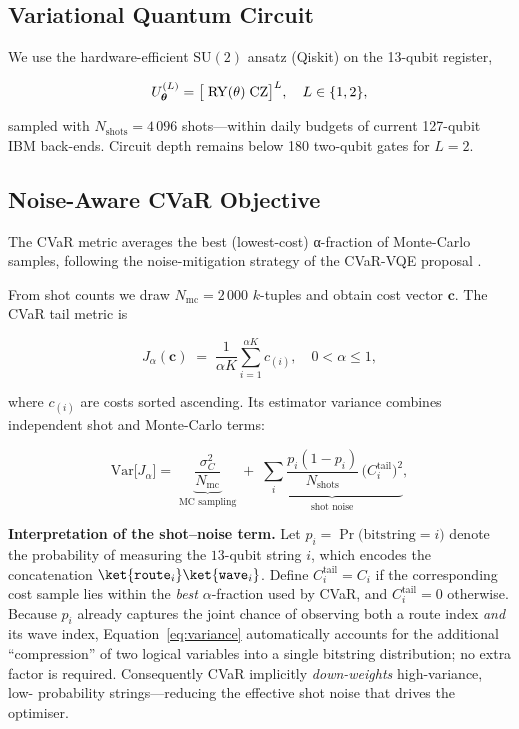 \subsection{Variational Quantum Circuit}

We use the hardware-efficient
\(\mathrm{SU}(2)\) ansatz (Qiskit) on the 13-qubit register,

\[
U^{(L)}_{\boldsymbol{\theta}}
=\bigl[\;{\rm RY}(\theta)\;{\rm CZ}\bigr]^{L},
\quad L\in\{1,2\},
\]

\noindent sampled with \(N_{\text{shots}}=4\,096\) shots—within daily
budgets of current 127-qubit IBM back-ends.  Circuit depth remains
below 180 two-qubit gates for \(L=2\).

\subsection{Noise-Aware CVaR Objective}

The CVaR metric averages the best (lowest-cost) α-fraction of Monte-Carlo samples, 
following the noise-mitigation strategy of the CVaR-VQE proposal \cite{barkoutsos2020cvar}.

From shot counts we draw \(N_{\mathrm{mc}}=2\,000\) $k$-tuples and obtain
cost vector \(\boldsymbol{c}\).  The CVaR tail metric is

\begin{equation}
    \label{eq:cvar}
    J_{\alpha}(\boldsymbol{c}) \;=\;
    \frac{1}{\alpha K}
    \sum_{i=1}^{\alpha K} c_{(i)},
    \quad
    0<\alpha\le 1,
\end{equation}
    

\noindent where \(c_{(i)}\) are costs sorted ascending.
Its estimator variance combines independent shot and Monte-Carlo terms:

\begin{equation}
    \label{eq:variance}
    \mathrm{Var}\!\bigl[J_{\alpha}\bigr]
    =\;\underbrace{\frac{\sigma_C^{2}}{N_{\text{mc}}}}_{\text{MC sampling}}
    \;+\;
    \underbrace{\sum_{i}
            \frac{p_i(1-p_i)}{N_{\text{shots}}}\,
            \bigl(C_i^{\mathrm{tail}}\bigr)^{2}}_{\text{shot noise}},
\end{equation}
    
\noindent
\textbf{Interpretation of the shot–noise term.}
Let $p_i=\Pr\!\bigl(\text{bitstring}=i\bigr)$ denote the probability of
measuring the $13$-qubit string ${i}$, which encodes the concatenation
$\ket{\texttt{route}_i}\ket{\texttt{wave}_i}$.  
Define
$C_i^{\mathrm{tail}} = C_i$ if the corresponding cost sample lies
within the \emph{best} $\alpha$-fraction used by CVaR, and
$C_i^{\mathrm{tail}} = 0$ otherwise.
Because $p_i$ already captures the joint chance of observing both a
route index \emph{and} its wave index, Equation~\eqref{eq:variance}
automatically accounts for the additional
``compression'' of two logical variables into a single bitstring
distribution; no extra factor is required.
Consequently CVaR implicitly \emph{down-weights} high-variance, low-%
probability strings—reducing the effective shot noise that drives the
optimiser.


